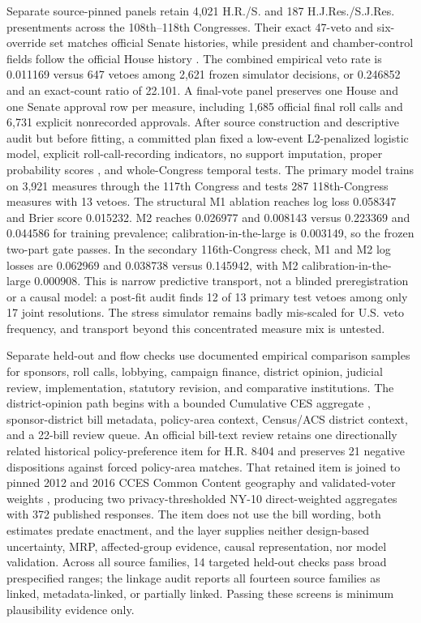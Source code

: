 \documentclass[manuscript]{acmart}
\begin{document}
Separate source-pinned panels retain 4,021 H.R./S. and 187 H.J.Res./S.J.Res. presentments across the 108th--118th Congresses. Their exact 47-veto and six-override set matches official Senate histories, while president and chamber-control fields follow the official House history \citep{HousePartyGovernment2026,SenatePresidentialVetoes2026}. The combined empirical veto rate is 0.011169 versus 647 vetoes among 2,621 frozen simulator decisions, or 0.246852 and an exact-count ratio of 22.101. A final-vote panel preserves one House and one Senate approval row per measure, including 1,685 official final roll calls and 6,731 explicit nonrecorded approvals. After source construction and descriptive audit but before fitting, a committed plan fixed a low-event L2-penalized logistic model, explicit roll-call-recording indicators, no support imputation, proper probability scores \citep{GelmanEtAl2008,GneitingRaftery2007}, and whole-Congress temporal tests. The primary model trains on 3,921 measures through the 117th Congress and tests 287 118th-Congress measures with 13 vetoes. The structural M1 ablation reaches log loss 0.058347 and Brier score 0.015232. M2 reaches 0.026977 and 0.008143 versus 0.223369 and 0.044586 for training prevalence; calibration-in-the-large is 0.003149, so the frozen two-part gate passes. In the secondary 116th-Congress check, M1 and M2 log losses are 0.062969 and 0.038738 versus 0.145942, with M2 calibration-in-the-large 0.000908. This is narrow predictive transport, not a blinded preregistration or a causal model: a post-fit audit finds 12 of 13 primary test vetoes among only 17 joint resolutions. The stress simulator remains badly mis-scaled for U.S. veto frequency, and transport beyond this concentrated measure mix is untested.

Separate held-out and flow checks use documented empirical comparison samples for sponsors, roll calls, lobbying, campaign finance, district opinion, judicial review, implementation, statutory revision, and comparative institutions. The district-opinion path begins with a bounded Cumulative CES aggregate \citep{CumulativeCES2025}, sponsor-district bill metadata, policy-area context, Census/ACS district context, and a 22-bill review queue. An official bill-text review retains one directionally related historical policy-preference item for H.R. 8404 and preserves 21 negative dispositions against forced policy-area matches. That retained item is joined to pinned 2012 and 2016 CCES Common Content geography and validated-voter weights \citep{CumulativeCESPolicyPreferences2023,CCESCommon2012,CCESCommon2016}, producing two privacy-thresholded NY-10 direct-weighted aggregates with 372 published responses. The item does not use the bill wording, both estimates predate enactment, and the layer supplies neither design-based uncertainty, MRP, affected-group evidence, causal representation, nor model validation. Across all source families, 14 targeted held-out checks pass broad prespecified ranges; the linkage audit reports all fourteen source families as linked, metadata-linked, or partially linked. Passing these screens is minimum plausibility evidence only.
\end{document}
